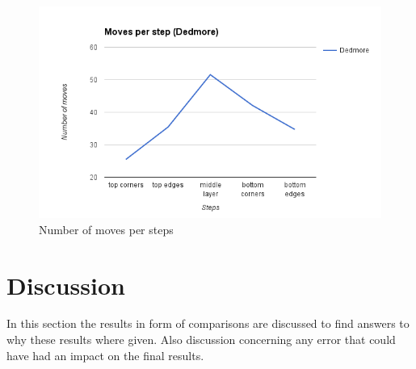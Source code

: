 \documentclass[a4paper,11pt]{kth-mag}
\begin{document}
\begin{figure}[ht!]
	\centering
	\includegraphics[width= 1.0\textwidth]{figs/dedmoresteps.png}
	\caption{Number of moves per steps}
	\label{fig_22}
\end{figure}

\chapter{Discussion}
In this section the results in form of comparisons are discussed to find answers to why these results where given. Also discussion concerning any error that could have had an impact on the final results.
\end{document}

